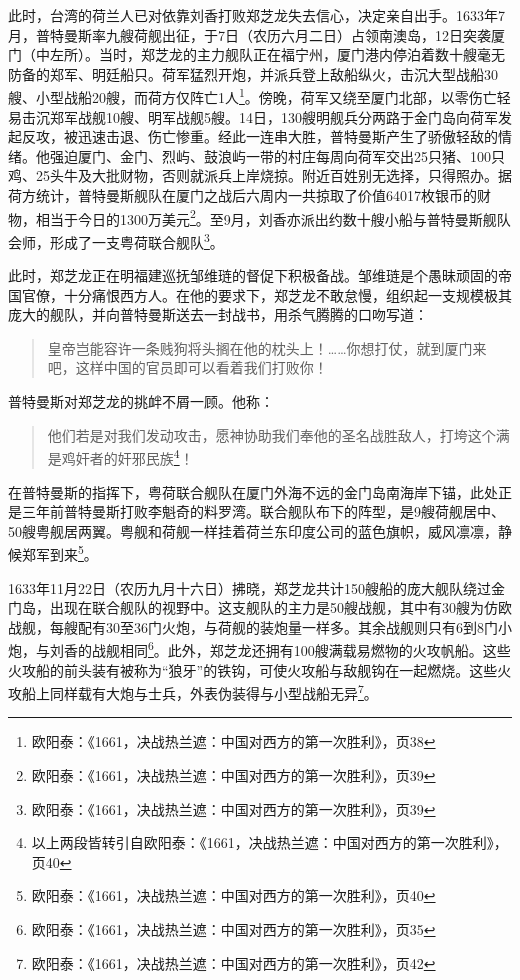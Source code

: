 此时，台湾的荷兰人已对依靠刘香打败郑芝龙失去信心，决定亲自出手。1633年7月，普特曼斯率九艘荷舰出征，于7日（农历六月二日）占领南澳岛，12日突袭厦门（中左所）。当时，郑芝龙的主力舰队正在福宁州，厦门港内停泊着数十艘毫无防备的郑军、明廷船只。荷军猛烈开炮，并派兵登上敌船纵火，击沉大型战船30艘、小型战船20艘，而荷方仅阵亡1人\footnote{欧阳泰：《1661，决战热兰遮：中国对西方的第一次胜利》，页38}。傍晚，荷军又绕至厦门北部，以零伤亡轻易击沉郑军战舰10艘、明军战舰5艘。14日，130艘明舰兵分两路于金门岛向荷军发起反攻，被迅速击退、伤亡惨重。经此一连串大胜，普特曼斯产生了骄傲轻敌的情绪。他强迫厦门、金门、烈屿、鼓浪屿一带的村庄每周向荷军交出25只猪、100只鸡、25头牛及大批财物，否则就派兵上岸烧掠。附近百姓别无选择，只得照办。据荷方统计，普特曼斯舰队在厦门之战后六周内一共掠取了价值64017枚银币的财物，相当于今日的1300万美元\footnote{欧阳泰：《1661，决战热兰遮：中国对西方的第一次胜利》，页39}。至9月，刘香亦派出约数十艘小船与普特曼斯舰队会师，形成了一支粤荷联合舰队\footnote{欧阳泰：《1661，决战热兰遮：中国对西方的第一次胜利》，页39}。

此时，郑芝龙正在明福建巡抚邹维琏的督促下积极备战。邹维琏是个愚昧顽固的帝国官僚，十分痛恨西方人。在他的要求下，郑芝龙不敢怠慢，组织起一支规模极其庞大的舰队，并向普特曼斯送去一封战书，用杀气腾腾的口吻写道：

\begin{quote}

皇帝岂能容许一条贱狗将头搁在他的枕头上！……你想打仗，就到厦门来吧，这样中国的官员即可以看着我们打败你！

\end{quote}

普特曼斯对郑芝龙的挑衅不屑一顾。他称：

\begin{quote}
他们若是对我们发动攻击，愿神协助我们奉他的圣名战胜敌人，打垮这个满是鸡奸者的奸邪民族\footnote{以上两段皆转引自欧阳泰：《1661，决战热兰遮：中国对西方的第一次胜利》，页40}！
\end{quote}

在普特曼斯的指挥下，粤荷联合舰队在厦门外海不远的金门岛南海岸下锚，此处正是三年前普特曼斯打败李魁奇的料罗湾。联合舰队布下的阵型，是9艘荷舰居中、50艘粤舰居两翼。粤舰和荷舰一样挂着荷兰东印度公司的蓝色旗帜，威风凛凛，静候郑军到来\footnote{欧阳泰：《1661，决战热兰遮：中国对西方的第一次胜利》，页40}。

1633年11月22日（农历九月十六日）拂晓，郑芝龙共计150艘船的庞大舰队绕过金门岛，出现在联合舰队的视野中。这支舰队的主力是50艘战舰，其中有30艘为仿欧战舰，每艘配有30至36门火炮，与荷舰的装炮量一样多。其余战舰则只有6到8门小炮，与刘香的战舰相同\footnote{欧阳泰：《1661，决战热兰遮：中国对西方的第一次胜利》，页35}。此外，郑芝龙还拥有100艘满载易燃物的火攻帆船。这些火攻船的前头装有被称为“狼牙”的铁钩，可使火攻船与敌舰钩在一起燃烧。这些火攻船上同样载有大炮与士兵，外表伪装得与小型战船无异\footnote{欧阳泰：《1661，决战热兰遮：中国对西方的第一次胜利》，页42}。

